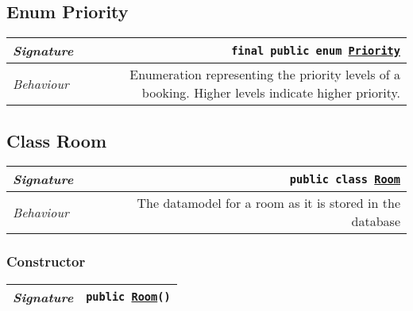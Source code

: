 \begin{adjustwidth}{1.5em}{0pt}
\begin{adjustwidth}{1.5em}{0pt}
\begin{adjustwidth}{1.5em}{0pt}
{\begin{tabularx}{1.0\linewidth}{@{}l R@{}}
      \end{tabularx}}
    \end{adjustwidth}
  \end{adjustwidth}\subsection{Enum Priority\label{edu.kit.hci.soli.domain.Priority} }
  \begin{adjustwidth}{1.5em}{0pt}
    {\begin{tabularx}{1.0\linewidth}{@{}l R@{}}
      \emph{Signature} & \texttt{final public  enum \texttt{\hyperref[edu.kit.hci.soli.domain.Priority]{\texttt{Priority}}}} \\
      \hline
      \emph{Behaviour} & Enumeration representing the priority levels of a booking. Higher levels indicate higher priority.  \\
      \hline
  
    \end{tabularx}}
  \end{adjustwidth}\subsection{Class Room\label{edu.kit.hci.soli.domain.Room} }
  \begin{adjustwidth}{1.5em}{0pt}
    {\begin{tabularx}{1.0\linewidth}{@{}l R@{}}
      \emph{Signature} & \texttt{public  class \texttt{\hyperref[edu.kit.hci.soli.domain.Room]{\texttt{Room}}}} \\
      \hline
      \emph{Behaviour} & The datamodel for a room as it is stored in the database  \\
      \hline
  
    \end{tabularx}}\subsubsection{Constructor\label{edu.kit.hci.soli.domain.Room@edu.kit.hci.soli.domain.Room()}}
    \begin{adjustwidth}{1.5em}{0pt}
      {\begin{tabularx}{1.0\linewidth}{@{}l R@{}}
        \emph{Signature} & \texttt{public \texttt{\hyperref[edu.kit.hci.soli.domain.Room]{\texttt{Room}}}()} \\
        \hline
  

\end{tabularx}}
\end{adjustwidth}
\end{adjustwidth}
\end{adjustwidth}

